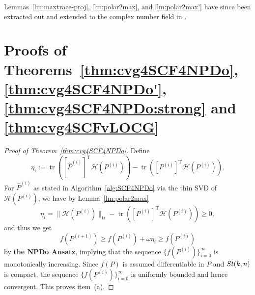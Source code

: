 \documentclass[11pt]{article}
\def\scrH{\mathscr{H}}
\def\what{\widehat}
\newcommand\STM[2]{{\rm St}(#1,#2)}
\DeclareMathOperator{\tr}{tr}
\DeclareMathOperator{\T}{T}
\theoremstyle{definition}
\numberwithin{equation}{section}
\begin{document}
Lemmas~\ref{lm:maxtrace-proj}, \ref{lm:polar2max}, and \ref{lm:polar2max'}
have since been extracted out and extended to the complex number field in \cite{li:2026}.

\section{Proofs of Theorems~\ref{thm:cvg4SCF4NPDo}, \ref{thm:cvg4SCF4NPDo'}, \ref{thm:cvg4SCF4NPDo:strong} and \ref{thm:cvg4SCFvLOCG}}\label{sec:Proof4NPDoCVG}

\begin{proof}[Proof of Theorem~\ref{thm:cvg4SCF4NPDo}]
Define
\begin{equation}\label{eq:cvg4SCF4NPDo-0'}
\eta_i:=\tr([\what P^{(i)}]^{\T}\scrH(P^{(i)}))-\tr([P^{(i)}]^{\T}\scrH(P^{(i)})).
\end{equation}
For $\what P^{(i)}$ as stated in Algorithm~\ref{alg:SCF4NPDo} via the thin SVD of $\scrH(P^{(i)})$, we have by Lemma~\ref{lm:polar2max}
\begin{equation} \label{eq:cvg4SCF4NPDo-0}
\eta_i=\|\scrH(P^{(i)})\|_{\tr}-\tr([P^{(i)}]^{\T}\scrH(P^{(i)}))\ge 0,
\end{equation}
and thus we get
\begin{equation}\label{eq:cvg4SCF4NPDo:obj}
f(P^{(i+1)})\ge f(P^{(i)})+\omega\eta_i\ge f(P^{(i)})
\end{equation}
by {\bf the NPDo Ansatz},
implying that the sequence $\{f(P^{(i)})\}_{i=0}^{\infty}$ is monotonically increasing.
Since $f(P)$ is assumed differentiable in $P$ and $\STM{k}{n}$ is compact,
the sequence $\{f(P^{(i)})\}_{i=0}^{\infty}$ is uniformly bounded and hence convergent. This proves item~(a).


\end{proof}
\end{document}
